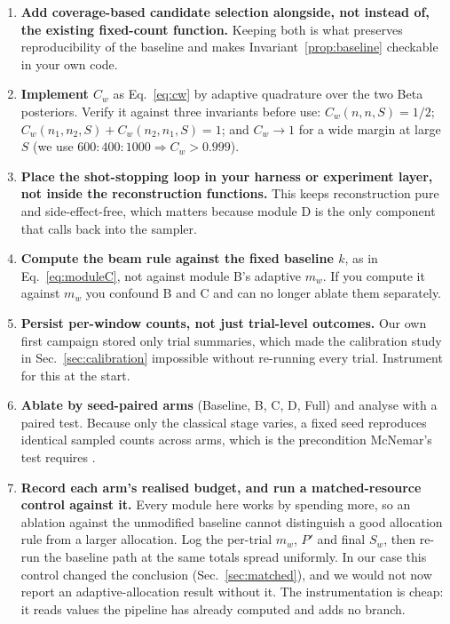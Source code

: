 \documentclass[preprint,11pt]{elsarticle}
\newcommand{\Cw}{C_w}
\begin{document}
\begin{enumerate}
\item \textbf{Add coverage-based candidate selection alongside, not
instead of, the existing fixed-count function.} Keeping both is what
preserves reproducibility of the baseline and makes
Invariant~\ref{prop:baseline} checkable in your own code.
\item \textbf{Implement $\Cw$} as Eq.~\eqref{eq:cw} by adaptive
quadrature over the two Beta posteriors. Verify it against three
invariants before use: $\Cw(n,n,S)=1/2$; $\Cw(n_1,n_2,S)+\Cw(n_2,n_1,S)=1$;
and $\Cw \to 1$ for a wide margin at large $S$ (we use
$600{:}400{:}1000 \Rightarrow \Cw > 0.999$).
\item \textbf{Place the shot-stopping loop in your harness or experiment
layer, not inside the reconstruction functions.} This keeps
reconstruction pure and side-effect-free, which matters because module D
is the only component that calls back into the sampler.
\item \textbf{Compute the beam rule against the fixed baseline $k$}, as
in Eq.~\eqref{eq:moduleC}, not against module B's adaptive $m_w$. If you
compute it against $m_w$ you confound B and C and can no longer ablate
them separately.
\item \textbf{Persist per-window counts, not just trial-level outcomes.}
Our own first campaign stored only trial summaries, which made the
calibration study in Sec.~\ref{sec:calibration} impossible without
re-running every trial. Instrument for this at the start.
\item \textbf{Ablate by seed-paired arms} (Baseline, B, C, D, Full) and
analyse with a paired test. Because only the classical stage varies, a
fixed seed reproduces identical sampled counts across arms, which is the
precondition McNemar's test requires \cite{dietterich1998}.
\item \textbf{Record each arm's realised budget, and run a
matched-resource control against it.} Every module here works by spending
more, so an ablation against the unmodified baseline cannot distinguish a
good allocation rule from a larger allocation. Log the per-trial $m_w$,
$P'$ and final $S_w$, then re-run the baseline path at the same totals
spread uniformly. In our case this control changed the conclusion
(Sec.~\ref{sec:matched}), and we would not now report an
adaptive-allocation result without it. The instrumentation is cheap: it
reads values the pipeline has already computed and adds no branch.
\end{enumerate}
\end{document}
